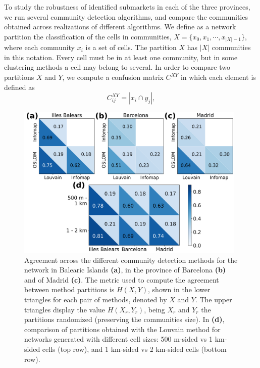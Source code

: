 To study the robustness of identified submarkets in each of the three provinces, we run several community detection algorithms, and compare the communities obtained across realizations of different algorithms. We define as a network partition the classification of the cells in communities, $X = \{x_0, x_1, \cdots , x_{|X|-1} \}$, where each community $x_i$ is a set of cells. The partition $X$ has $|X|$ communities in this notation. Every cell must be in at least one community, but in some clustering methods a cell may belong to several.
In order to compare two partitions $X$ and $Y$, we compute a confusion matrix $C^{XY}$ in which each element is defined as
\begin{equation}
    C^{XY}_{ij} = | x_i \cap y_j | ,
\end{equation}
\begin{figure}
    \label{fig:agreement_scale_method}
    \centering
    \includegraphics[width = 0.98\textwidth]{Figs/Idealista_segmentation/Agreement_method_scale.pdf}
	\caption[Agreement across three methods and cell sizes.]{ Agreement across the different community detection methods for the network in Balearic Islands \textbf{(a)}, in the province of Barcelona \textbf{(b)} and of Madrid \textbf{(c)}. The metric used to compute the agreement between method partitions is $H(X,Y)$, shown in the lower triangles for each pair of methods, denoted by $X$ and $Y$. The upper triangles display the value $H(X_r,Y_r)$, being $X_r$ and $Y_r$ the partitions randomized (preserving the communities size). In \textbf{(d)}, comparison of partitions obtained with the Louvain method for networks generated with different cell sizes: 500 m-sided vs  1 km-sided cells (top row), and 1 km-sided vs 2 km-sided cells (bottom row). }
\end{figure}
